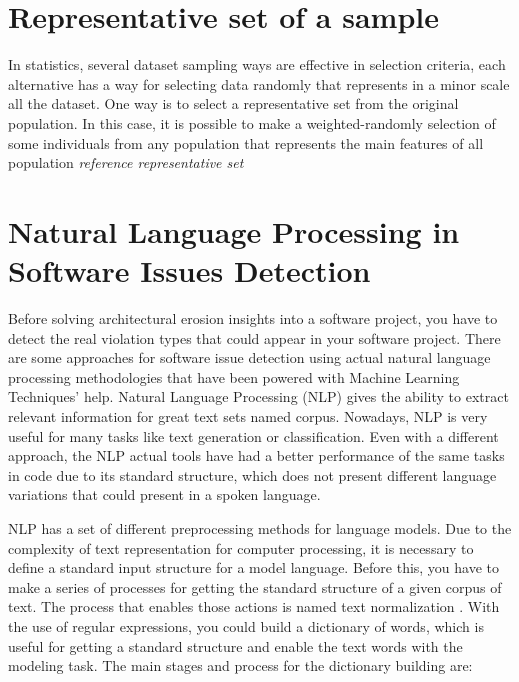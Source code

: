 \newpage

\section{Representative set of a sample}
In statistics, several dataset sampling ways are effective in selection criteria, each alternative has a way for selecting data randomly that represents in a minor scale all the dataset. One way is to select a representative set from the original population. In this case, it is possible to make a weighted-randomly selection of some individuals from any population that represents the main features of all population \emph{reference representative set}

\section{Natural Language Processing in Software Issues Detection}
Before solving architectural erosion insights into a software project, you have to detect the real violation types that could appear in your software project. There are some approaches for software issue detection using actual natural language processing methodologies that have been powered with Machine Learning Techniques' help. Natural Language Processing (NLP) gives the ability to extract relevant information for great text sets named corpus. Nowadays, NLP is very useful for many tasks like text generation or classification. Even with a different approach, the NLP actual tools have had a better performance of the same tasks in code due to its standard structure, which does not present different language variations that could present in a spoken language.

NLP has a set of different preprocessing methods for language models. Due to the complexity of text representation for computer processing, it is necessary to define a standard input structure for a model language. Before this, you have to make a series of processes for getting the standard structure of a given corpus of text. The process that enables those actions is named text normalization \citet{nlp-fundamentals}. With the use of regular expressions, you could build a dictionary of words, which is useful for getting a standard structure and enable the text words with the modeling task. The main stages and process for the dictionary building are:

